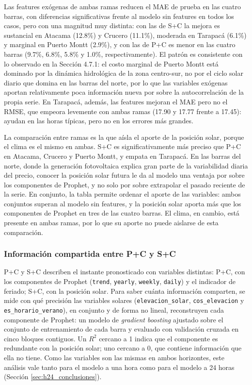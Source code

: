 Las features exógenas de ambas ramas reducen el MAE de prueba en las cuatro barras, con diferencias significativas frente al modelo sin features en todos los casos, pero con una magnitud muy distinta: con las de S+C la mejora es sustancial en Atacama (12.8\%) y Crucero (11.1\%), moderada en Tarapacá (6.1\%) y marginal en Puerto Montt (2.9\%), y con las de P+C es menor en las cuatro barras (9.7\%, 6.8\%, 5.8\% y 1.0\%, respectivamente). El patrón es consistente con lo observado en la Sección 4.7.1: el costo marginal de Puerto Montt está dominado por la dinámica hidrológica de la zona centro-sur, no por el ciclo solar diario que domina en las barras del norte, por lo que las variables exógenas aportan relativamente poca información nueva por sobre la autocorrelación de la propia serie. En Tarapacá, además, las features mejoran el MAE pero no el RMSE, que empeora levemente con ambas ramas (17.90 y 17.77 frente a 17.45): ayudan en las horas típicas, pero no en los errores más grandes.

La comparación entre ramas es la que aísla el aporte de la posición solar, porque el clima es el mismo en ambas. S+C es significativamente más preciso que P+C en Atacama, Crucero y Puerto Montt, y empata en Tarapacá. En las barras del norte, donde la generación fotovoltaica explica gran parte de la variabilidad diaria del precio, conocer la posición solar futura le da al modelo una ventaja por sobre los componentes de Prophet, y no solo por sobre extrapolar el pasado reciente de la serie. En conjunto, la tabla permite ordenar el aporte de las variables: ambos conjuntos superan al modelo sin features, y la posición solar aporta más que los componentes de Prophet en tres de las cuatro barras. El clima, en cambio, está presente en ambas ramas, por lo que su aporte no puede aislarse de esta comparación.

\subsubsection{Información compartida entre P+C y S+C}
\label{sec:informacion_pc_sc}

P+C y S+C describen el instante pronosticado con variables distintas: P+C, con los componentes de Prophet (\texttt{trend}, \texttt{yearly}, \texttt{weekly}, \texttt{daily}) y el indicador de feriado; S+C, con la posición solar. Para saber cuánta información comparten, se mide con qué precisión las variables solares (\texttt{elevacion\_solar}, \texttt{cos\_elevacion} y \texttt{es\_horario\_verano}), en conjunto y de forma no lineal, reconstruyen cada componente de Prophet: un modelo de \textit{gradient boosting} ajustado sobre el conjunto de entrenamiento de cada barra y evaluado con validación cruzada en cinco bloques contiguos. Un $R^2$ cercano a 1 indica que el componente es redundante con la posición solar; uno cercano a 0, que contiene información que ella no tiene. Como las variables son las mismas en ambos horizontes, este análisis vale tanto para el modelo a una hora como para el modelo a 24 horas (Sección \ref{sec:h24_conclusiones}).

